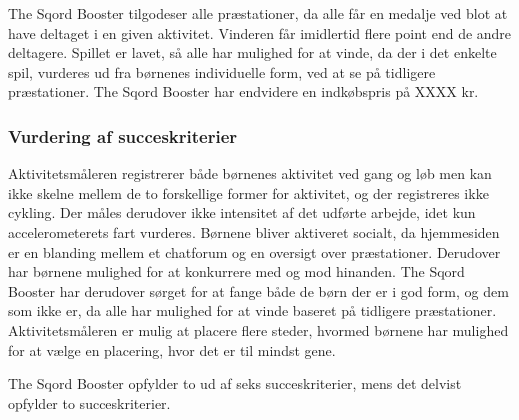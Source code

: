 The Sqord Booster tilgodeser alle præstationer, da alle får en medalje ved blot at have deltaget i en given aktivitet. Vinderen får imidlertid flere point end de andre deltagere. Spillet er lavet, så alle har mulighed for at vinde, da der i det enkelte spil, vurderes ud fra børnenes individuelle form, ved at se på tidligere præstationer. \citep{Sqord_family2015} \newline
The Sqord Booster har endvidere en indkøbspris på XXXX kr. 

\subsubsection{Vurdering af succeskriterier}
Aktivitetsmåleren registrerer både børnenes aktivitet ved gang og løb men kan ikke skelne mellem de to forskellige former for aktivitet, og der registreres ikke cykling. Der måles derudover ikke intensitet af det udførte arbejde, idet kun accelerometerets fart vurderes. \newline
Børnene bliver aktiveret socialt, da hjemmesiden er en blanding mellem et chatforum og en oversigt over præstationer. Derudover har børnene mulighed for at konkurrere med og mod hinanden. The Sqord Booster har derudover sørget for at fange både de børn der er i god form, og dem som ikke er, da alle har mulighed for at vinde baseret på tidligere præstationer. Aktivitetsmåleren er mulig at placere flere steder, hvormed børnene har mulighed for at vælge en placering, hvor det er til mindst gene.

The Sqord Booster opfylder to ud af seks succeskriterier, mens det delvist opfylder to succeskriterier.

